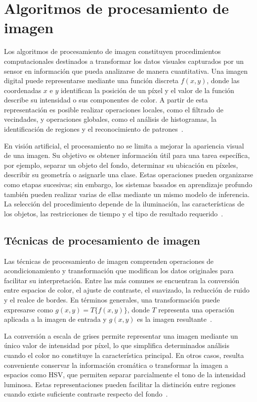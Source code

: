 \section{Algoritmos de procesamiento de imagen}
Los algoritmos de procesamiento de imagen constituyen procedimientos computacionales destinados a transformar los datos visuales capturados por un sensor en información que pueda analizarse de manera cuantitativa. Una imagen digital puede representarse mediante una función discreta $f(x,y)$, donde las coordenadas $x$ e $y$ identifican la posición de un píxel y el valor de la función describe su intensidad o sus componentes de color. A partir de esta representación es posible realizar operaciones locales, como el filtrado de vecindades, y operaciones globales, como el análisis de histogramas, la identificación de regiones y el reconocimiento de patrones~\cite{gonzalez2018digital,szeliski2022computer}.

En visión artificial, el procesamiento no se limita a mejorar la apariencia visual de una imagen. Su objetivo es obtener información útil para una tarea específica, por ejemplo, separar un objeto del fondo, determinar su ubicación en píxeles, describir su geometría o asignarle una clase. Estas operaciones pueden organizarse como etapas sucesivas; sin embargo, los sistemas basados en aprendizaje profundo también pueden realizar varias de ellas mediante un mismo modelo de inferencia. La selección del procedimiento depende de la iluminación, las características de los objetos, las restricciones de tiempo y el tipo de resultado requerido~\cite{szeliski2022computer}.

\subsection{Técnicas de procesamiento de imagen}
Las técnicas de procesamiento de imagen comprenden operaciones de acondicionamiento y transformación que modifican los datos originales para facilitar su interpretación. Entre las más comunes se encuentran la conversión entre espacios de color, el ajuste de contraste, el suavizado, la reducción de ruido y el realce de bordes. En términos generales, una transformación puede expresarse como $g(x,y)=T\{f(x,y)\}$, donde $T$ representa una operación aplicada a la imagen de entrada y $g(x,y)$ es la imagen resultante~\cite{gonzalez2018digital}.

La conversión a escala de grises permite representar una imagen mediante un único valor de intensidad por píxel, lo que simplifica determinados análisis cuando el color no constituye la característica principal. En otros casos, resulta conveniente conservar la información cromática o transformar la imagen a espacios como HSV, que permiten separar parcialmente el tono de la intensidad luminosa. Estas representaciones pueden facilitar la distinción entre regiones cuando existe suficiente contraste respecto del fondo~\cite{szeliski2022computer}.

